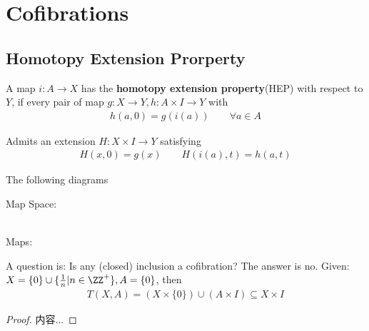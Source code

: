 \documentclass[Total.tex]{subfiles}
\begin{document}
		\section{Cofibrations}
			\subsection{Homotopy Extension Prorperty}
				\begin{Def}
					A map $i:A\rightarrow X$ has the \textbf{homotopy extension property}(HEP) with respect to $Y$, if every pair of map $g:X\rightarrow Y,h:A\times I\rightarrow Y$ with 
					\begin{gather*}
						h(a,0)=g(i(a))\qquad \forall a\in A
					\end{gather*}
					
					Admits an extension $H:X\times I\rightarrow Y$ satisfying
					\begin{gather*}
						H(x,0)=g(x)\qquad H(i(a),t)=h(a,t)
					\end{gather*}
				\end{Def}
				
				The following diagrams
				\begin{center}
					Map Space: \\
					Maps: 
				\end{center}
				
				\begin{example}
					A question is: Is any (closed) inclusion a cofibration? The answer is no. Given: $X=\{0\}\cup \{\frac{1}{n}|n\in \ZZ^+\},A=\{0\}$, then 
					\begin{gather*}
						T(X,A)=(X\times \{0\})\cup (A\times I)\subseteq X\times I
					\end{gather*}
					
					\begin{proposition}
						
					\end{proposition}
					\begin{proof}
						内容...
					\end{proof}
				\end{example}
\end{document}

